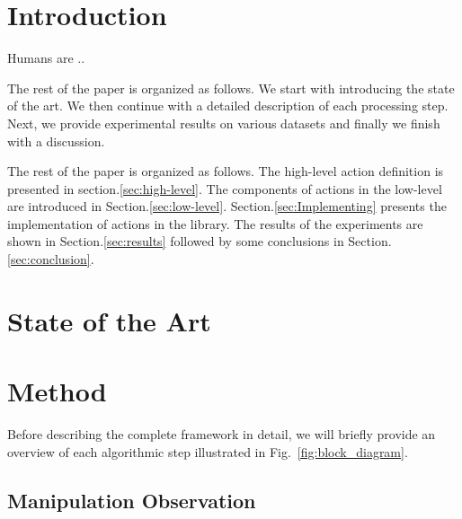 \section{Introduction}


Humans are  ..
 
The rest of the paper is organized as follows. We start with introducing the state of the art. We then continue with a detailed description of each processing step. Next, we provide experimental results on various datasets and finally we finish with a discussion.

The rest of the paper is organized as follows.
The high-level action definition is presented in section.\ref{sec:high-level}.
The components of actions in the low-level are introduced in Section.\ref{sec:low-level}.
Section.\ref{sec:Implementing} presents the implementation of actions in the library.
The results of the experiments are shown in Section.\ref{sec:results} followed by some conclusions in Section.\ref{sec:conclusion}.




\section{State of the Art}
\label{sec:soa}
 

\section{Method}
\label{sec:method}

Before describing the complete framework in detail, we will briefly provide an overview of each algorithmic step illustrated in Fig.~\ref{fig:block_diagram}.
 

\subsection{Manipulation Observation}
\label{sec:observation}
 



